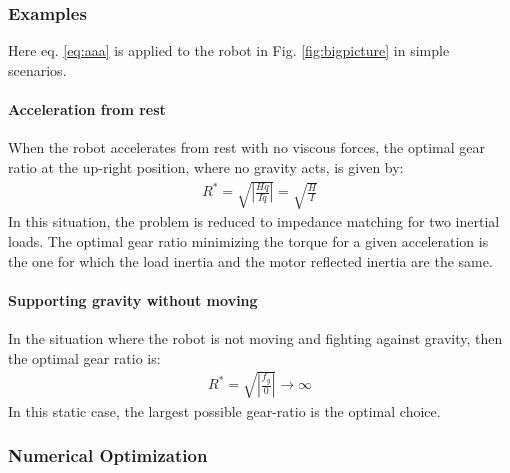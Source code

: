 \newpage

\subsubsection{Examples}
\label{sec:Examples}

Here eq. \eqref{eq:aaa} is applied to the robot in Fig. \ref{fig:bigpicture} in simple scenarios. 

\paragraph{Acceleration from rest} 

When the robot accelerates from rest with no viscous forces, the optimal gear ratio at the up-right position, where no gravity acts, is given by:
\begin{align}
	R^{*}  = \sqrt{ \left | \frac{H \ddot{q} }{ I \ddot{q} } \right |   } = \sqrt{ \frac{H}{I}}
 \label{eq:impmatching}
\end{align}
In this situation, the problem is reduced to impedance matching for two inertial loads. The optimal gear ratio minimizing the torque for a given acceleration is the one for which the load inertia and the motor reflected inertia are the same.

\paragraph{Supporting gravity without moving}

In the situation where the robot is not moving and fighting against gravity, then the optimal gear ratio is:
\begin{align}
	R^{*}  = \sqrt{ \left | \frac{ f_g }{ 0 } \right |   } \rightarrow \infty
 \label{eq:gravrejection}
\end{align}
In this static case, the largest possible gear-ratio is the optimal choice. 


\subsubsection{Numerical Optimization}

